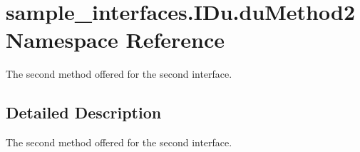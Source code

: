 \hypertarget{namespacesample__interfaces_1_1_i_du_1_1du_method2}{\section{sample\-\_\-interfaces.\-I\-Du.\-du\-Method2 Namespace Reference}
\label{namespacesample__interfaces_1_1_i_du_1_1du_method2}
}


The second method offered for the second interface.  




\subsection{Detailed Description}
The second method offered for the second interface. 